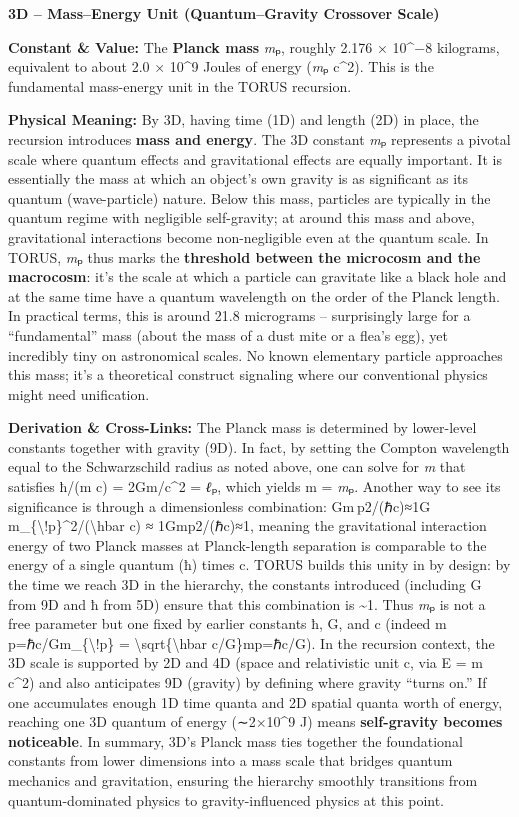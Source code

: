 \textbf{3D -- Mass--Energy Unit (Quantum--Gravity Crossover Scale)}

\textbf{Constant \& Value:} The \textbf{Planck mass} \emph{m}ₚ, roughly
2.176 × 10\^{}−8 kilograms​, equivalent to about 2.0 × 10\^{}9 Joules of
energy (\emph{m}ₚ c\^{}2). This is the fundamental mass-energy unit in
the TORUS recursion.

\textbf{Physical Meaning:} By 3D, having time (1D) and length (2D) in
place, the recursion introduces \textbf{mass and energy}. The 3D
constant \emph{m}ₚ represents a pivotal scale where quantum effects and
gravitational effects are equally important. It is essentially the mass
at which an object's own gravity is as significant as its quantum
(wave-particle) nature​. Below this mass, particles are typically in the
quantum regime with negligible self-gravity; at around this mass and
above, gravitational interactions become non-negligible even at the
quantum scale. In TORUS, \emph{m}ₚ thus marks the \textbf{threshold
between the microcosm and the macrocosm}​: it's the scale at which a
particle can gravitate like a black hole and at the same time have a
quantum wavelength on the order of the Planck length. In practical
terms, this is around 21.8 micrograms -- surprisingly large for a
``fundamental'' mass (about the mass of a dust mite or a flea's egg),
yet incredibly tiny on astronomical scales​. No known elementary
particle approaches this mass; it's a theoretical construct signaling
where our conventional physics might need unification.

\textbf{Derivation \& Cross-Links:} The Planck mass is determined by
lower-level constants together with gravity (9D). In fact, by setting
the Compton wavelength equal to the Schwarzschild radius as noted above,
one can solve for \emph{m} that satisfies ħ/(m c) = 2Gm/c\^{}2 =
\emph{ℓ}ₚ, which yields m = \emph{m}ₚ​. Another way to see its
significance is through a dimensionless combination: Gm ⁣p2/(ℏc)≈1G
m\_\{\textbackslash{}!p\}\^{}2/(\textbackslash{}hbar c) ≈
1Gmp2​/(ℏc)≈1​, meaning the gravitational interaction energy of two
Planck masses at Planck-length separation is comparable to the energy of
a single quantum (ħ) times c. TORUS builds this unity in by design: by
the time we reach 3D in the hierarchy, the constants introduced
(including G from 9D and ħ from 5D) ensure that this combination is
\textasciitilde{}1​. Thus \emph{m}ₚ is not a free parameter but one
fixed by earlier constants ħ, G, and c (indeed
m ⁣p=ℏc/Gm\_\{\textbackslash{}!p\} =
\textbackslash{}sqrt\{\textbackslash{}hbar c/G\}mp​=ℏc/G​). In the
recursion context, the 3D scale is supported by 2D and 4D (space and
relativistic unit c, via E = m c\^{}2) and also anticipates 9D (gravity)
by defining where gravity ``turns on.'' If one accumulates enough 1D
time quanta and 2D spatial quanta worth of energy, reaching one 3D
quantum of energy (∼2×10\^{}9 J) means \textbf{self-gravity becomes
noticeable}​. In summary, 3D's Planck mass ties together the
foundational constants from lower dimensions into a mass scale that
bridges quantum mechanics and gravitation, ensuring the hierarchy
smoothly transitions from quantum-dominated physics to
gravity-influenced physics at this point.

